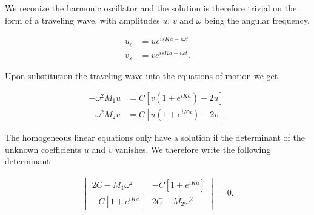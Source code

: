 We reconize the harmonic oscillator and the solution is therefore trivial on the form of a traveling wave, with amplitudes $u$, $v$ and $\omega$ being the angular frequency.

\begin{align}
u_s &= ue^{isKa - i\omega t} \\
v_s &= ve^{isKa - i\omega t}.
\end{align}

Upon substitution the traveling wave into the equations of motion we get

\begin{align}
-\omega^2M_1u &= C\left[ v\left( 1 + e^{iKa} \right) -2u \right] \\
-\omega^2M_2v &= C\left[ u\left( 1 + e^{iKa} \right) -2v \right].
\end{align}

The homogeneous linear equations only have a solution if the determinant of the unknown coefficients $u$ and $v$ vanishes. We therefore write the following determinant

\begin{align}
\begin{vmatrix}
2C - M_1\omega^2 & -C\left[1 + e^{iKa}\right] \\
-C\left[1 + e^{iKa}\right] & 2C - M_2\omega^2
\end{vmatrix}
= 0.
\label{eq:bandgap}
\end{align}